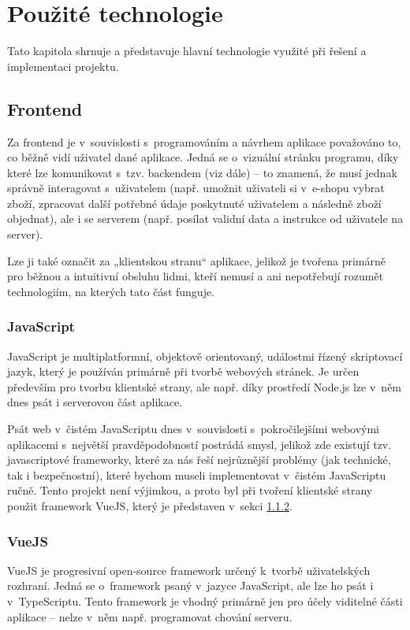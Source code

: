 \chapter{Použité technologie}
Tato kapitola shrnuje a představuje hlavní technologie využité při řešení a implementaci projektu.

\section{Frontend}
Za frontend je v~souvislosti s~programováním a návrhem aplikace považováno to, co běžně vidí uživatel dané aplikace. Jedná se o~vizuální stránku programu, díky které lze komunikovat s~tzv. backendem (viz dále) – to znamená, že musí jednak správně interagovat s~uživatelem (např. umožnit uživateli si v~e-shopu vybrat zboží, zpracovat další potřebné údaje poskytnuté uživatelem a následně zboží objednat), ale i se serverem (např. posílat validní data a instrukce od uživatele na server).

Lze ji také označit za „klientskou stranu“ aplikace, jelikož je tvořena primárně pro běžnou a intuitivní obsluhu lidmi, kteří nemusí a ani nepotřebují rozumět technologiím, na kterých tato část funguje. \cite{FEvsBE}

	\subsection{JavaScript}
	JavaScript je multiplatformní, objektově orientovaný, událostmi řízený skriptovací jazyk, který je používán primárně při tvorbě webových stránek. Je určen především pro tvorbu klientské strany, ale např. díky prostředí Node.js lze v~něm dnes psát i serverovou část aplikace. \cite{JS1}\cite{JS2}
	
	Psát web v~čistém JavaScriptu dnes v~souvislosti s~pokročilejšími webovými aplikacemi s~největší pravděpodobností postrádá smysl, jelikož zde existují tzv. javascriptové frameworky, které za nás řeší nejrůznější problémy (jak technické, tak i bezpečnostní), které bychom museli implementovat v~čistém JavaScriptu ručně. Tento projekt není výjimkou, a proto byl při tvoření klientské strany použit framework VueJS, který je představen v~sekci \ref{sec:vuejs}.
	
	\subsection{VueJS}\label{sec:vuejs}
	VueJS je progresivní open-source framework určený k~tvorbě uživatelských rozhraní. Jedná se o~framework psaný v~jazyce JavaScript, ale lze ho psát i v~TypeScriptu. Tento framework je vhodný primárně jen pro účely viditelné části aplikace – nelze v~něm např. programovat chování serveru. \cite{VueJS1}
	
